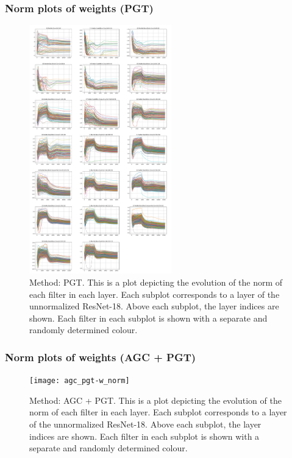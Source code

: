 \documentclass[times,sort&compress]{elsarticle}
\begin{document}
\newpage \subsubsection{Norm plots of weights (PGT)} \begin{figure}[h] \centering
\includegraphics[width=0.55\textwidth]{pgt-w_norm} \caption{ Method: PGT. This is a plot
depicting the evolution of the norm of each filter in each layer. Each subplot
corresponds to a layer of the unnormalized ResNet-18. Above each subplot, the layer
indices are shown. Each filter in each subplot is shown with a separate and randomly
determined colour. } \end{figure}

\newpage \subsubsection{Norm plots of weights (AGC + PGT)} \begin{figure}[h] \centering
\texttt{[image: agc\_pgt-w\_norm]} \caption{ Method: AGC + PGT. This
is a plot depicting the evolution of the norm of each filter in each layer. Each subplot
corresponds to a layer of the unnormalized ResNet-18. Above each subplot, the layer
indices are shown. Each filter in each subplot is shown with a separate and randomly
determined colour. } \end{figure}
\end{document}
